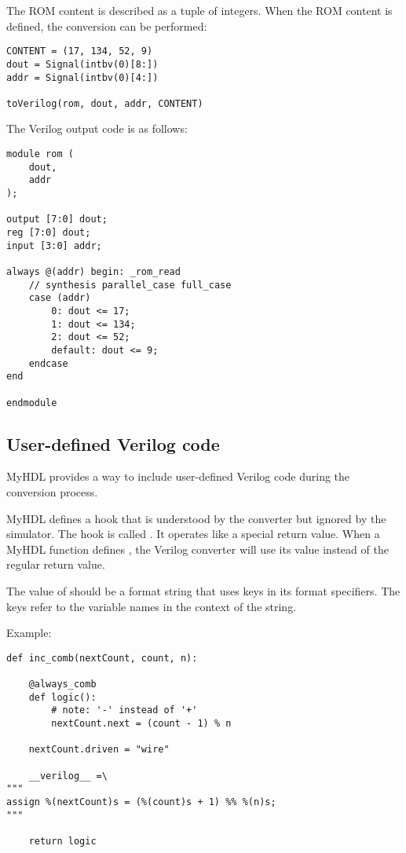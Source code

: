 The ROM content is described as a tuple of integers. When the
ROM content is defined, the conversion can be performed:

\begin{verbatim}
CONTENT = (17, 134, 52, 9)
dout = Signal(intbv(0)[8:])
addr = Signal(intbv(0)[4:])
                                                                                
toVerilog(rom, dout, addr, CONTENT)
\end{verbatim}

The Verilog output code is as follows:

\begin{verbatim}
module rom (
    dout,
    addr
);
                                                                                
output [7:0] dout;
reg [7:0] dout;
input [3:0] addr;
                                                                       
always @(addr) begin: _rom_read
    // synthesis parallel_case full_case
    case (addr)
        0: dout <= 17;
        1: dout <= 134;
        2: dout <= 52;
        default: dout <= 9;
    endcase
end
                                                                                
endmodule
\end{verbatim}

\subsection{User-defined Verilog code \label{conf-usage-custom}}

MyHDL provides a way  to include user-defined Verilog
code during the conversion process.

MyHDL defines a hook that is understood by the converter but ignored by
the simulator. The hook is called . It operates
like a special return value. When a MyHDL function defines
, the Verilog converter will use its value instead of the
regular return value.

The value of  should be a format string that uses keys in
its format specifiers. The keys refer to the variable names in the
context of the string.

Example:

\begin{verbatim}
def inc_comb(nextCount, count, n):

    @always_comb
    def logic():
        # note: '-' instead of '+'
        nextCount.next = (count - 1) % n

    nextCount.driven = "wire"

    __verilog__ =\
"""
assign %(nextCount)s = (%(count)s + 1) %% %(n)s;
"""

    return logic
\end{verbatim}

